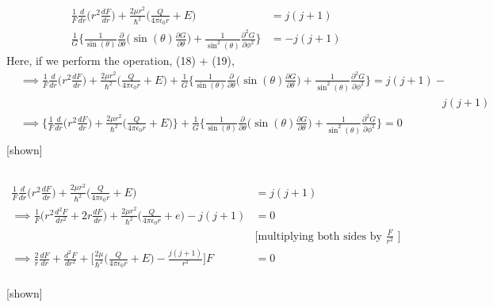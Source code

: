 \documentclass{article}
\begin{document}
\large{

\begin{align*}
    \frac{1}{F}\frac{d}{dr}\Big(r^2\frac{dF}{dr}\Big)+\frac{2\mu r^2}{\hbar^2}\Big(\frac{Q}{4\pi \epsilon_0 r} + E \Big) &= j(j+1)\tag{18}\\
    \frac{1}{G}\Big\{\frac{1}{\sin(\theta)}\frac{\partial}{\partial \theta}\Big(\sin(\theta)\frac{\partial G}{\partial \theta}\Big) + \frac{1}{\sin^2(\theta)}\frac{\partial^2G}{\partial \phi^2}\Big\} &= -j(j+1)\tag{19}
\end{align*}
Here, if we perform the operation, (18) + (19),
\begin{align*}
    &\implies \frac{1}{F}\frac{d}{dr}\Big(r^2\frac{dF}{dr}\Big)+\frac{2\mu r^2}{\hbar^2}\Big(\frac{Q}{4\pi \epsilon_0 r} + E \Big) + \frac{1}{G}\Big\{\frac{1}{\sin(\theta)}\frac{\partial}{\partial \theta}\Big(\sin(\theta)\frac{\partial G}{\partial \theta}\Big) + \frac{1}{\sin^2(\theta)}\frac{\partial^2G}{\partial \phi^2}\Big\} = j(j+1) - \\
    &\hspace{16cm}j(j+1)\\
    &\implies \Big\{\frac{1}{F}\frac{d}{dr}\Big(r^2\frac{dF}{dr}\Big)+\frac{2\mu r^2}{\hbar^2}\Big(\frac{Q}{4\pi \epsilon_0 r} + E \Big)\Big\} + \frac{1}{G}\Big\{\frac{1}{\sin(\theta)}\frac{\partial}{\partial \theta}\Big(\sin(\theta)\frac{\partial G}{\partial \theta}\Big) + \frac{1}{\sin^2(\theta)}\frac{\partial^2G}{\partial \phi^2}\Big\} = 0\\
\end{align*}
\hspace{15cm}[shown]

}
\vspace{2cm}

\subsection{}%

\large{
\begin{align*}
    \frac{1}{F}\frac{d}{dr}\Big(r^2\frac{dF}{dr}\Big)+\frac{2\mu r^2}{\hbar^2}\Big(\frac{Q}{4\pi \epsilon_0 r} + E \Big) &= j(j+1)\tag{18}\\
    \implies \frac{1}{F}\Big(r^2\frac{d^2F}{dr^2}+2r\frac{dF}{dr}\Big) + \frac{2\mu r^2}{\hbar^2}\Big(\frac{Q}{4\pi \epsilon_0 r} + e\Big) - j(j+1) &= 0\\
                                                                                                                                                & \text{[multiplying both sides by $\frac{F}{r^2}$ ]}\\
    \implies \frac{2}{r}\frac{dF}{dr}+\frac{d^2F}{dr^2}+\Bigg[\frac{2 \mu}{\hbar^2}\Big(\frac{Q}{4\pi \epsilon_0 r} + E\Big)-\frac{j(j+1)}{r^2}\Bigg]F &= 0\\
\end{align*}

\hspace{13cm}[shown]

}
\end{document}
